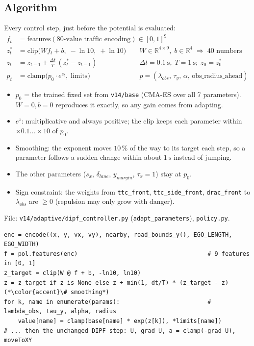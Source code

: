 \documentclass[11pt,a4paper]{article}
\begin{document}
\subsection{Algorithm}
Every control step, just before the potential is evaluated:
\begin{align*}
  f_t   &= \text{features}(\text{80-value traffic encoding}) \in [0,1]^9 \\
  z^*_t &= \mathrm{clip}\big(W f_t + b,\; -\ln 10,\; +\ln 10\big)
          && W \in \mathbb{R}^{4\times 9},\; b \in \mathbb{R}^{4} \;\Rightarrow\; 40 \text{ numbers} \\
  z_t   &= z_{t-1} + \tfrac{\Delta t}{T}\,(z^*_t - z_{t-1})
          && \Delta t = 0.1~\mathrm{s},\; T = 1~\mathrm{s};\; z_0 = z^*_0 \\
  p_t   &= \mathrm{clamp}\big(p_0 \cdot e^{z_t},\; \text{limits}\big)
          && p = (\lambda_{obs},\, \tau_{y},\, \alpha,\, \text{obs\_radius\_ahead})
\end{align*}
\begin{itemize}
  \item $p_0$ = the trained fixed set from \texttt{v14/base} (CMA-ES over all 7 parameters).
        $W = 0, b = 0$ reproduces it exactly, so any gain comes from adapting.
  \item $e^{z}$: multiplicative and always positive; the clip keeps each parameter within $\times 0.1 \dots \times 10$ of $p_0$.
  \item Smoothing: the exponent moves $10\,\%$ of the way to its target each step, so a parameter follows a
        sudden change within about $1~\mathrm{s}$ instead of jumping.
  \item The other parameters ($s_x$, $\delta_{lane}$, $y_{margin}$, $\tau_x = 1$) stay at $p_0$.
  \item Sign constraint: the weights from \texttt{ttc\_front}, \texttt{ttc\_side\_front}, \texttt{drac\_front}
        to $\lambda_{obs}$ are $\ge 0$ (repulsion may only grow with danger).
\end{itemize}

File: \texttt{v14/adaptive/dipf\_controller.py} (\texttt{adapt\_parameters}), \texttt{policy.py}.
\begin{lstlisting}
enc = encode((x, y, vx, vy), nearby, road_bounds_y(), EGO_LENGTH, EGO_WIDTH)
f = pol.features(enc)                                     # 9 features in [0, 1]
z_target = clip(W @ f + b, -ln10, ln10)
z = z_target if z is None else z + min(1, dt/T) * (z_target - z)   (*\color{accent}\# smoothing*)
for k, name in enumerate(params):                         # lambda_obs, tau_y, alpha, radius
    value[name] = clamp(base[name] * exp(z[k]), *limits[name])
# ... then the unchanged DIPF step: U, grad U, a = clamp(-grad U), moveToXY
\end{lstlisting}
\end{document}
